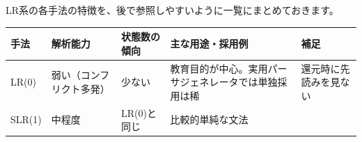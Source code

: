 LR系の各手法の特徴を、後で参照しやすいように一覧にまとめておきます。

\begin{longtable}[]{@{}lllll@{}}
\toprule
\begin{minipage}[b]{0.17\columnwidth}\raggedright
手法\strut
\end{minipage} & \begin{minipage}[b]{0.17\columnwidth}\raggedright
解析能力\strut
\end{minipage} & \begin{minipage}[b]{0.17\columnwidth}\raggedright
状態数の傾向\strut
\end{minipage} & \begin{minipage}[b]{0.17\columnwidth}\raggedright
主な用途・採用例\strut
\end{minipage} & \begin{minipage}[b]{0.17\columnwidth}\raggedright
補足\strut
\end{minipage}\tabularnewline
\midrule
\endhead
\begin{minipage}[t]{0.17\columnwidth}\raggedright
LR(0)\strut
\end{minipage} & \begin{minipage}[t]{0.17\columnwidth}\raggedright
弱い（コンフリクト多発）\strut
\end{minipage} & \begin{minipage}[t]{0.17\columnwidth}\raggedright
少ない\strut
\end{minipage} & \begin{minipage}[t]{0.17\columnwidth}\raggedright
教育目的が中心。実用パーサジェネレータでは単独採用は稀\strut
\end{minipage} & \begin{minipage}[t]{0.17\columnwidth}\raggedright
還元時に先読みを見ない\strut
\end{minipage}\tabularnewline
\begin{minipage}[t]{0.17\columnwidth}\raggedright
SLR(1)\strut
\end{minipage} & \begin{minipage}[t]{0.17\columnwidth}\raggedright
中程度\strut
\end{minipage} & \begin{minipage}[t]{0.17\columnwidth}\raggedright
LR(0)と同じ\strut
\end{minipage} & \begin{minipage}[t]{0.17\columnwidth}\raggedright
比較的単純な文法\strut
\end{minipage} & \begin{minipage}[t]{0.17\columnwidth}\raggedright

\end{minipage}
\end{longtable}
